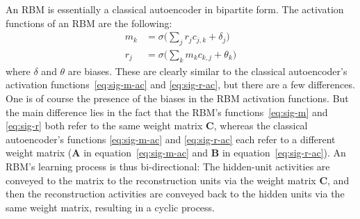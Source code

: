 An RBM is essentially a 
classical autoencoder in bipartite form. The activation functions of an RBM are the following: 
\begin{align}
\label{eq:sig-m}
m_{k} &= \sigma\big(\sum_{j} r_{j} c_{j,k} + \delta_{j}\big) \\
\label{eq:sig-r}
r_{j} &= \sigma\big(\sum_{k}  m_{k} c_{k,j} + \theta_{k}\big)
\end{align}
where $\delta$ and $\theta$ are biases. 
These are clearly similar to the classical autoencoder's activation functions~\eqref{eq:sig-m-ac} and \eqref{eq:sig-r-ac},
but there are a few differences. One is of course the presence of the biases in the 
RBM activation functions. But the main difference 
lies in the fact that the RBM's functions~\eqref{eq:sig-m} and \eqref{eq:sig-r} 
both refer to the same weight matrix $\textbf{C}$, whereas the classical 
autoencoder's  functions \ref{eq:sig-m-ac} and \ref{eq:sig-r-ac} each 
refer to a different weight matrix 
($\textbf{A}$ in equation~\ref{eq:sig-m-ac} and $\textbf{B}$ in equation~\ref{eq:sig-r-ac}). 
An RBM's learning process is thus bi-directional: 
The hidden-unit activities are conveyed to the matrix to the reconstruction 
units via the weight matrix $\textbf{C}$, and then the reconstruction 
activities are conveyed back to the hidden units via the same weight matrix, resulting in a cyclic process. 




